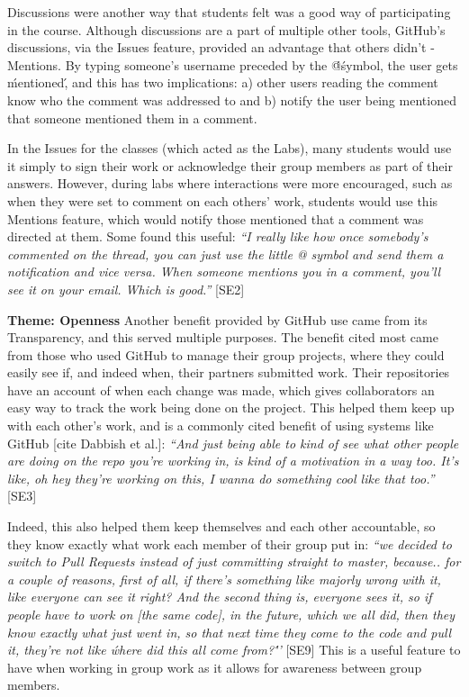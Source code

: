 Discussions were another way that students felt was a good way of participating in the course. Although discussions are a part of multiple other tools, GitHub's discussions, via the Issues feature, provided an advantage that others didn't - Mentions. By typing someone's username preceded by the \'@\' symbol, the user gets \'mentioned\', and this has two implications: a) other users reading the comment know who the comment was addressed to and b) notify the user being mentioned that someone mentioned them in a comment.

In the Issues for the classes (which acted as the Labs), many students would use it simply to sign their work or acknowledge their group members as part of their answers. However, during labs where interactions were more encouraged, such as when they were set to comment on each others' work, students would use this Mentions feature, which would notify those mentioned that a comment was directed at them. Some found this useful: \textit{``I really like how once somebody's commented on the thread, you can just use the little @ symbol and send them a notification and vice versa. When someone mentions you in a comment, you'll see it on your email. Which is good.''} [SE2]

\textbf{Theme: Openness} \break
Another benefit provided by GitHub use came from its Transparency, and this served multiple purposes. The benefit cited most came from those who used GitHub to manage their group projects, where they could easily see if, and indeed when, their partners submitted work. Their repositories have an account of when each change was made, which gives collaborators an easy way to track the work being done on the project. This helped them keep up with each other's work, and is a commonly cited benefit of using systems like GitHub [cite Dabbish et al.]: \textit{``And just being able to kind of see what other people are doing on the repo you're working in, is kind of a motivation in a way too. It's like, oh hey they're working on this, I wanna do something cool like that too.''} [SE3]

Indeed, this also helped them keep themselves and each other accountable, so they know exactly what work each member of their group put in: \textit{``we decided to switch to Pull Requests instead of just committing straight to master, because.. for a couple of reasons, first of all, if there's something like majorly wrong with it, like everyone can see it right? And the second thing is, everyone sees it, so if people have to work on [the same code], in the future, which we all did, then they know exactly what just went in, so that next time they come to the code and pull it, they're not like \'where did this all come from?\'''} [SE9] This is a useful feature to have when working in group work as it allows for awareness between group members.


